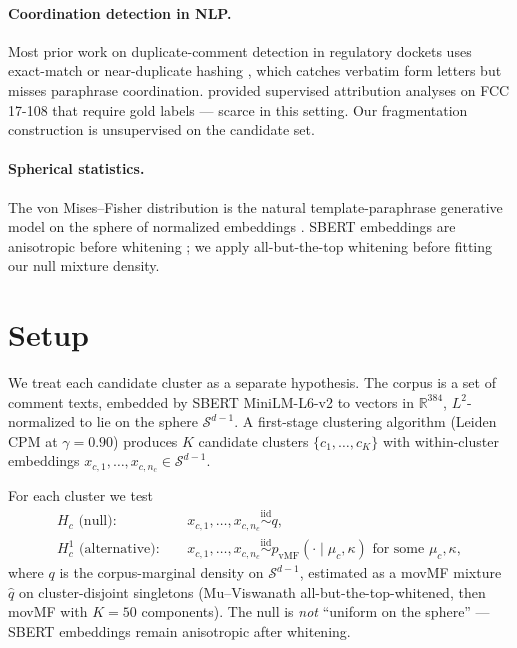 \documentclass{article}
\theoremstyle{definition}
\theoremstyle{remark}
\newcommand{\R}{\mathbb{R}}
\newcommand{\sphere}{\mathcal{S}^{d-1}}
\begin{document}
\paragraph{Coordination detection in NLP.} Most prior work on duplicate-comment detection in regulatory dockets uses exact-match or near-duplicate hashing \citep{kao2017,handannader2024}, which catches verbatim form letters but misses paraphrase coordination. \citet{handannader2024} provided supervised attribution analyses on FCC 17-108 that require gold labels --- scarce in this setting. Our fragmentation construction is unsupervised on the candidate set.

\paragraph{Spherical statistics.} The von Mises--Fisher distribution is the natural template-paraphrase generative model on the sphere of normalized embeddings \citep{banerjee2005,hornik2014}. SBERT embeddings are anisotropic before whitening \citep{ethayarajh2019,mu2018}; we apply all-but-the-top whitening before fitting our null mixture density.

\section{Setup}
\label{sec:setup}

We treat each candidate cluster as a separate hypothesis. The corpus is a set of comment texts, embedded by SBERT MiniLM-L6-v2 to vectors in $\R^{384}$, $L^2$-normalized to lie on the sphere $\sphere$. A first-stage clustering algorithm (Leiden CPM at $\gamma = 0.90$) produces $K$ candidate clusters $\{c_1, \ldots, c_K\}$ with within-cluster embeddings $x_{c,1}, \ldots, x_{c,n_c} \in \sphere$.

For each cluster we test
\begin{align}
H_c \text{ (null)}: &\quad x_{c,1}, \ldots, x_{c,n_c} \stackrel{\mathrm{iid}}{\sim} q, \\
H_c^1 \text{ (alternative)}: &\quad x_{c,1}, \ldots, x_{c,n_c} \stackrel{\mathrm{iid}}{\sim} p_{\mathrm{vMF}}(\cdot \mid \mu_c, \kappa) \text{ for some } \mu_c, \kappa,
\end{align}
where $q$ is the corpus-marginal density on $\sphere$, estimated as a movMF mixture $\hat q$ on cluster-disjoint singletons (Mu--Viswanath \citeyearpar{mu2018} all-but-the-top-whitened, then movMF with $K = 50$ components). The null is \emph{not} ``uniform on the sphere'' --- SBERT embeddings remain anisotropic after whitening.
\end{document}

